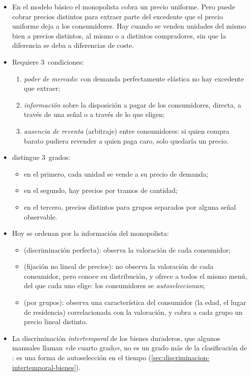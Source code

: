 \documentclass[11pt]{article}
\begin{document}
\begin{itemize}
\item En el modelo básico el monopolista cobra un precio uniforme. Pero puede cobrar precios distintos para extraer parte del excedente que el precio uniforme deja a los consumidores. Hay  cuando se venden unidades del mismo bien a precios distintos, al mismo o a distintos compradores, sin que la diferencia se deba a diferencias de coste\nocite{Varian1989Price}.
\item Requiere 3~condiciones:
  \begin{enumerate}
  \item \emph{poder de mercado}: con demanda perfectamente elástica no hay excedente que extraer;
  \item \emph{información} sobre la disposición a pagar de los consumidores, directa, a través de una señal o a través de lo que eligen;
  \item \emph{ausencia de reventa} (arbitraje) entre consumidores: si quien compra barato pudiera revender a quien paga caro, solo quedaría un precio.
  \end{enumerate}
\item \textcite{Pigou1920Economics} distingue 3~grados:
  \begin{itemize}
  \item en el primero, cada unidad se vende a su precio de demanda;
  \item en el segundo, hay precios por tramos de cantidad;
  \item en el tercero, precios distintos para grupos separados por alguna señal observable.
  \end{itemize}
\item Hoy se ordenan por la información del monopolista\nocite{Tirole1988Theory}:
  \begin{itemize}
  \item {} (discriminación perfecta): observa la valoración de cada consumidor;
  \item {} (fijación no lineal de precios): no observa la valoración de cada consumidor, pero conoce su distribución, y ofrece a todos el mismo menú, del que cada uno elige: los consumidores se \emph{autoseleccionan};
  \item {} (por grupos): observa una característica del consumidor (la edad, el lugar de residencia) correlacionada con la valoración, y cobra a cada grupo un precio lineal distinto.
  \end{itemize}
\item La discriminación \emph{intertemporal} de los bienes duraderos, que algunos manuales llaman «de cuarto grado», no es un grado más de la clasificación de : es una forma de autoselección en el tiempo (\ref{sec:discriminacion-intertemporal-bienes}).
\end{itemize}
\end{document}

